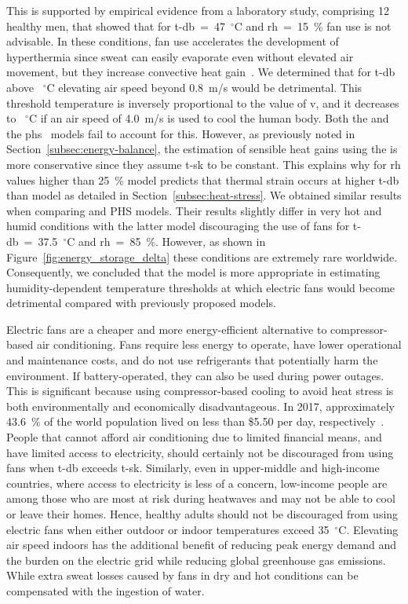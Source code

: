 This is supported by empirical evidence from a laboratory study, comprising 12 healthy men, that showed that for \ac{t-db}~=~47~$^{\circ}$C and \ac{rh}~=~15~\% fan use is not advisable.
In these conditions, fan use accelerates the development of hyperthermia since sweat can easily evaporate even without elevated air movement, but they increase convective heat gain~\cite{Morris2021a}.
We determined that for \ac{t-db} above ~$^{\circ}$C elevating air speed beyond 0.8~m/s would be detrimental.
This threshold temperature is inversely proportional to the value of \ac{v}, and it decreases to ~$^{\circ}$C if an air speed of 4.0~m/s is used to cool the human body.
Both the  and the \ac{phs}~\cite{iso7933} models fail to account for this.
However, as previously noted in Section~\ref{subsec:energy-balance}, the estimation of sensible heat gains using the  is more conservative since they assume \ac{t-sk} to be constant.
This explains why for \ac{rh} values higher than 25~\%  model predicts that thermal strain occurs at higher \ac{t-db} than  model as detailed in Section~\ref{subsec:heat-stress}.
We obtained similar results when comparing  and PHS models.
Their results slightly differ in very hot and humid conditions with the latter model discouraging the use of fans for \ac{t-db}~=~37.5~$^{\circ}$C and \ac{rh}~=~85~\%\@.
However, as shown in Figure~\ref{fig:energy_storage_delta} these conditions are extremely rare worldwide.
Consequently, we concluded that the  model is more appropriate in estimating humidity-dependent temperature thresholds at which electric fans would become detrimental compared with previously proposed models.

Electric fans are a cheaper and more energy-efficient alternative to compressor-based air conditioning.
Fans require less energy to operate, have lower operational and maintenance costs, and do not use refrigerants that potentially harm the environment. 
If battery-operated, they can also be used during power outages.
This is significant because using compressor-based cooling to avoid heat stress is both environmentally and economically disadvantageous.
In 2017, approximately 43.6~\% of the world population lived on less than \$5.50 per day, respectively~\cite{PovertyO1:online}.
People that cannot afford air conditioning due to limited financial means, and have limited access to electricity, should certainly not be discouraged from using fans when \ac{t-db} exceeds \ac{t-sk}.
Similarly, even in upper-middle and high-income countries, where access to electricity is less of a concern, low-income people are among those who are most at risk during heatwaves and may not be able to cool or leave their homes.
Hence, healthy adults should not be discouraged from using electric fans when either outdoor or indoor temperatures exceed 35~$^{\circ}$C.\@
Elevating air speed indoors has the additional benefit of reducing peak energy demand and the burden on the electric grid while reducing global greenhouse gas emissions.
While extra sweat losses caused by fans in dry and hot conditions can be compensated with the ingestion of water.

